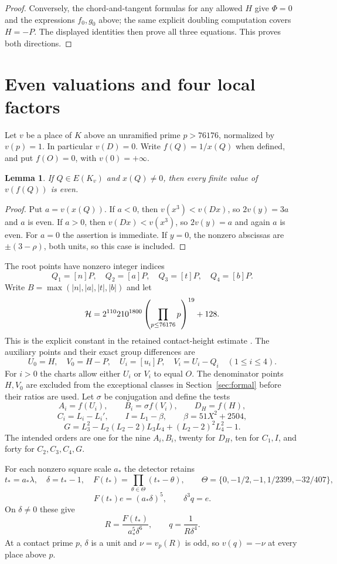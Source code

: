 \documentclass[11pt,a4paper]{article}
\newtheorem{lemma}[theorem]{Lemma}
\theoremstyle{remark}\newtheorem{remark}[theorem]{Remark}
\begin{document}
\begin{proof}
Conversely, the chord-and-tangent formulas for any allowed $H$ give
$\Phi=0$ and the expressions $f_0,g_0$ above; the same explicit
doubling computation covers $H=-P$. The displayed identities then
prove all three equations. This proves both directions.
\end{proof}

\section{Even valuations and four local factors}
Let $v$ be a place of $K$ above an unramified prime $p>76176$,
normalized by $v(p)=1$. In particular $v(D)=0$. Write $f(Q)=1/x(Q)$
when defined, and put $f(O)=0$, with $v(0)=+\infty$.

\begin{lemma}\label{lem:even}
If $Q\in E(K_v)$ and $x(Q)\ne0$, then every finite value of
$v(f(Q))$ is even.
\end{lemma}
\begin{proof}
Put $a=v(x(Q))$. If $a<0$, then $v(x^3)<v(Dx)$, so
$2v(y)=3a$ and $a$ is even. If $a>0$, then
$v(Dx)<v(x^3)$, so $2v(y)=a$ and again $a$ is even.
For $a=0$ the assertion is immediate. If $y=0$, the nonzero abscissas
are $\pm(3-\rho)$, both units, so this case is included.
\end{proof}

The root points have nonzero integer indices
\[
 Q_1=[n]P,\quad Q_2=[a]P,\quad Q_3=[t]P,\quad Q_4=[b]P.
\]
Write $B=\max(|n|,|a|,|t|,|b|)$ and let
\[
 \mathcal H=2^{110}210^{1800}
          \left(\prod_{p\le76176}p\right)^{19}+128.
\]
This is the explicit constant in the retained contact-height estimate
\cite{Explicit}.
The auxiliary points and their exact group differences are
\[
 U_0=H,\quad V_0=H-P,\quad U_i=[u_i]P,\quad
 V_i=U_i-Q_i\quad(1\le i\le4).
\]
For $i>0$ the charts allow either $U_i$ or $V_i$ to equal $O$.
The denominator points $H,V_0$ are excluded from the exceptional
classes in Section~\ref{sec:formal} before their ratios are used.
Let $\sigma$ be conjugation and define the tests
\[
 A_i=f(U_i),\qquad B_i=\sigma f(V_i),\qquad D_H=f(H),
\]
\[
 C_i=L_i-L_i',\qquad I=L_1-\beta,\qquad \beta=51X^2+2504,
\]
\[
 G=L_3^2-L_2(L_2-2)L_3L_4+(L_2-2)^2L_4^2-1.
\]
The intended orders are one for the nine $A_i,B_i$, twenty for
$D_H$, ten for $C_1,I$, and forty for $C_2,C_3,C_4,G$.

For each nonzero square scale $a_*$ the detector retains
\[
 t_*=a_*\lambda,\quad \delta=t_*-1,\quad
 F(t_*)=\prod_{\theta\in\Theta}(t_*-\theta),\qquad
 \Theta=\{0,-1/2,-1,1/2399,-32/407\},
\]
\begin{equation}\label{eq:clearedweights}
 F(t_*)e=(a_*\delta)^5,\qquad \delta^3q=e.
\end{equation}
On $\delta\ne0$ these give
\[
 R=\frac{F(t_*)}{a_*^5\delta^6},\qquad q=\frac1{R\delta^4}.
\]
At a contact prime $p$, $\delta$ is a unit and $\nu=v_p(R)$ is odd,
so $v(q)=-\nu$ at every place above $p$.
\end{document}
